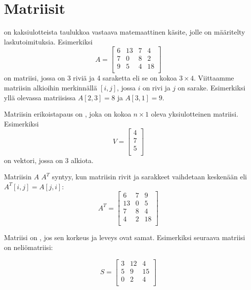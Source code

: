 \chapter{Matriisit}


 on kaksiulotteista taulukkoa
vastaava matemaattinen käsite,
jolle on määritelty laskutoimituksia.
Esimerkiksi
\[
A = 
 \begin{bmatrix}
  6 & 13 & 7 & 4 \\
  7 & 0 & 8 & 2 \\
  9 & 5 & 4 & 18 \\
 \end{bmatrix}
\]
on matriisi, jossa on 3 riviä ja 4 saraketta
eli se on kokoa $3 \times 4$.
Viittaamme matriisin alkioihin
merkinnällä $[i,j]$,
jossa $i$ on rivi ja $j$ on sarake.
Esimerkiksi yllä olevassa matriisissa
$A[2,3]=8$ ja $A[3,1]=9$.


Matriisin erikoistapaus on ,
joka on kokoa $n \times 1$ oleva yksiulotteinen matriisi.
Esimerkiksi
\[
V =
\begin{bmatrix}
4 \\
7 \\
5 \\
\end{bmatrix}
\]
on vektori, jossa on 3 alkiota.


Matriisin $A$  $A^T$ syntyy,
kun matriisin rivit ja sarakkeet vaihdetaan
keskenään eli $A^T[i,j]=A[j,i]$:
\[
A^T = 
 \begin{bmatrix}
  6 & 7 & 9 \\
  13 & 0 & 5 \\
  7 & 8 & 4 \\
  4 & 2 & 18 \\
 \end{bmatrix}
\]


Matriisi on , jos sen
korkeus ja leveys ovat samat.
Esimerkiksi seuraava matriisi on neliömatriisi:

\[
S = 
 \begin{bmatrix}
  3 & 12 & 4  \\
  5 & 9 & 15  \\
  0 & 2 & 4 \\
 \end{bmatrix}
\]

